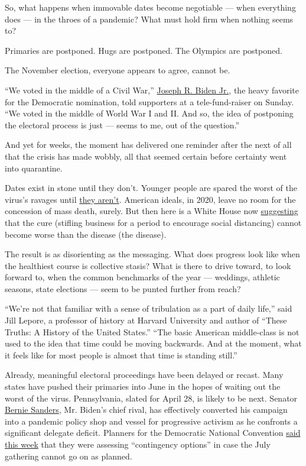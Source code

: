 So, what happens when immovable dates become negotiable --- when
everything does --- in the throes of a pandemic? What must hold firm
when nothing seems to?

Primaries are postponed. Hugs are postponed. The Olympics are postponed.

The November election, everyone appears to agree, cannot be.

``We voted in the middle of a Civil War,''
\href{https://www.nytimes3xbfgragh.onion/interactive/2020/us/elections/joe-biden.html}{Joseph
R. Biden Jr.}, the heavy favorite for the Democratic nomination, told
supporters at a tele-fund-raiser on Sunday. ``We voted in the middle of
World War I and II. And so, the idea of postponing the electoral process
is just --- seems to me, out of the question.''

And yet for weeks, the moment has delivered one reminder after the next
of all that the crisis has made wobbly, all that seemed certain before
certainty went into quarantine.

Dates exist in stone until they don't. Younger people are spared the
worst of the virus's ravages until
\href{https://www.nytimes3xbfgragh.onion/2020/03/18/health/coronavirus-young-people.html}{they
aren't}. American ideals, in 2020, leave no room for the concession of
mass death, surely. But then here is a White House now
\href{https://www.nytimes3xbfgragh.onion/2020/03/23/us/politics/trump-coronavirus-restrictions.html}{suggesting}
that the cure (stifling business for a period to encourage social
distancing) cannot become worse than the disease (the disease).

The result is as disorienting as the messaging. What does progress look
like when the healthiest course is collective stasis? What is there to
drive toward, to look forward to, when the common benchmarks of the year
--- weddings, athletic seasons, state elections --- seem to be punted
further from reach?

``We're not that familiar with a sense of tribulation as a part of daily
life,'' said Jill Lepore, a professor of history at Harvard University
and author of ``These Truths: A History of the United States.'' ``The
basic American middle-class is not used to the idea that time could be
moving backwards. And at the moment, what it feels like for most people
is almost that time is standing still.''

Already, meaningful electoral proceedings have been delayed or recast.
Many states have pushed their primaries into June in the hopes of
waiting out the worst of the virus. Pennsylvania, slated for April 28,
is likely to be next. Senator
\href{https://www.nytimes3xbfgragh.onion/interactive/2020/us/elections/bernie-sanders.html}{Bernie
Sanders}, Mr. Biden's chief rival, has effectively converted his
campaign into a pandemic policy shop and vessel for progressive activism
as he confronts a significant delegate deficit. Planners for the
Democratic National Convention
\href{https://www.nytimes3xbfgragh.onion/2020/03/23/us/politics/democratic-convention-milwaukee-coronavirus.html}{said
this week} that they were assessing ``contingency options'' in case the
July gathering cannot go on as planned.

